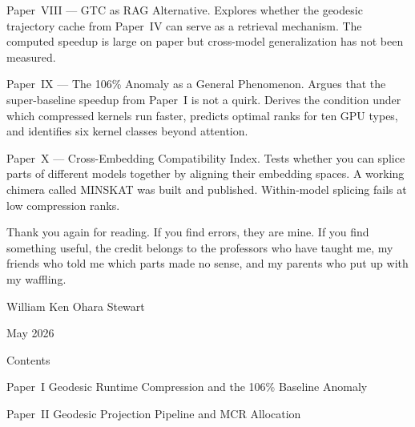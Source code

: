 \documentclass[11pt]{article}
\begin{document}
\vspace{4pt}

\noindent Paper~VIII --- GTC as RAG Alternative.
Explores whether the geodesic trajectory cache from Paper~IV can serve as a
retrieval mechanism. The computed speedup is large on paper but cross-model
generalization has not been measured.

\vspace{4pt}

\noindent Paper~IX --- The 106\% Anomaly as a General Phenomenon.
Argues that the super-baseline speedup from Paper~I is not a quirk. Derives the
condition under which compressed kernels run faster, predicts optimal ranks for
ten GPU types, and identifies six kernel classes beyond attention.

\vspace{4pt}

\noindent Paper~X --- Cross-Embedding Compatibility Index.
Tests whether you can splice parts of different models together by aligning their
embedding spaces. A working chimera called MINSKAT was built and published.
Within-model splicing fails at low compression ranks.

\vspace{14pt}

Thank you again for reading. If you find errors, they are mine. If you find
something useful, the credit belongs to the professors who have taught me, my
friends who told me which parts made no sense, and my parents who put up with
my waffling.

\vspace{8pt}

\begin{flushright}
William Ken Ohara Stewart

May 2026
\end{flushright}

\clearpage

\begin{center}
{\Large Contents}
\end{center}

\vspace{12pt}

\noindent Paper~I \hfill Geodesic Runtime Compression and the 106\% Baseline Anomaly

\noindent Paper~II \hfill Geodesic Projection Pipeline and MCR Allocation
\end{document}
